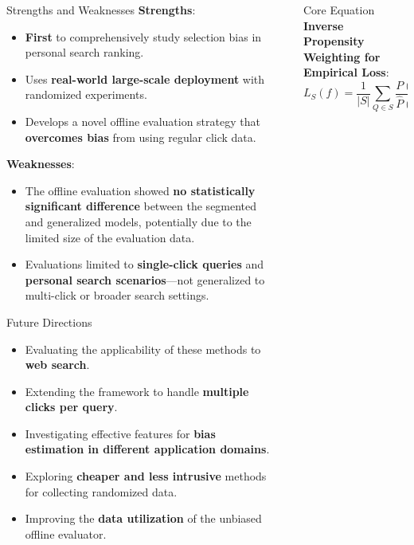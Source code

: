 \documentclass[final]{beamer}
\newlength{\sepwidth}
\newlength{\colwidth}
\newcommand{\separatorcolumn}{\begin{column}{\sepwidth}\end{column}}
\begin{document}
\begin{frame}[t]
\begin{columns}[t]
\begin{column}{\colwidth}
  \begin{block}{Strengths and Weaknesses}
    \textbf{Strengths}:
    \begin{itemize}
      \item \textbf{First} to comprehensively study selection bias in personal search ranking.
      \item Uses \textbf{real-world large-scale deployment} with randomized experiments.
      \item Develops a novel offline evaluation strategy that \textbf{overcomes bias} from using regular click data.
    \end{itemize}
    \textbf{Weaknesses}:
    \begin{itemize}
      \item The offline evaluation showed \textbf{no statistically significant difference} between the segmented and generalized models, potentially due to the limited size of the evaluation data. 
      \item Evaluations limited to \textbf{single-click queries} and \textbf{personal search scenarios}—not generalized to multi-click or broader search settings.
    \end{itemize}
  \end{block}

  \begin{block}{Future Directions}
    \begin{itemize}
      \item Evaluating the applicability of these methods to \textbf{web search}.
      \item Extending the framework to handle \textbf{multiple clicks per query}.
      \item Investigating effective features for \textbf{bias estimation in different application domains}.
      \item Exploring \textbf{cheaper and less intrusive} methods for collecting randomized data.
      \item Improving the \textbf{data utilization} of the unbiased offline evaluator.
    \end{itemize}
  \end{block}
\end{column}


\separatorcolumn
\begin{column}{\colwidth}
  \begin{block}{Core Equation}
    \textbf{Inverse Propensity Weighting for Empirical Loss}:
    \[
    L_S(f) = \frac{1}{|S|} \sum_{Q \in S} \frac{P(Q)}{\hat{P}(Q)} \cdot l(Q, f) = \frac{1}{|S|} \sum_{Q \in S} w_Q \cdot l(Q, f)
    \]
    

\end{block}
\end{column}
\end{columns}
\end{frame}
\end{document}
